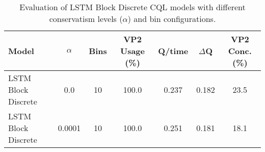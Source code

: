 \begin{table}[ht]
\centering
\caption{Evaluation of LSTM Block Discrete CQL models with different conservatism levels ($\alpha$) and bin configurations.}
\label{tab:lstm_cql_evaluation}
\begin{tabular}{lcccccc}
\toprule
Model & $\alpha$ & Bins & VP2 Usage (\%) & Q/time & $\Delta$Q & VP2 Conc. (\%) \\
\midrule
LSTM Block Discrete & 0.0 & 10 & 100.0 & 0.237 & 0.182 & 23.5 \\
LSTM Block Discrete & 0.0001 & 10 & 100.0 & 0.251 & 0.181 & 18.1 \\
\bottomrule
\end{tabular}
\end{table}